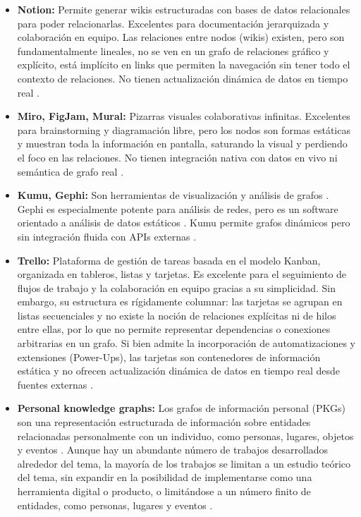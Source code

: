 \begin{itemize}
  \item \textbf{Notion:} Permite generar wikis estructuradas con bases de datos relacionales para poder relacionarlas. Excelentes para documentación jerarquizada y colaboración en equipo. Las relaciones entre nodos (wikis) existen, pero son fundamentalmente lineales, no se ven en un grafo de relaciones gráfico y explícito, está implícito en links que permiten la navegación sin tener todo el contexto de relaciones. No tienen actualización dinámica de datos en tiempo real \cite{notion_about, morton2025}.
  \item \textbf{Miro, FigJam, Mural:} Pizarras visuales colaborativas infinitas. Excelentes para brainstorming \cite{mural_brainstorming} y diagramación libre, pero los nodos son formas estáticas y muestran toda la información en pantalla, saturando la visual y perdiendo el foco en las relaciones. No tienen integración nativa con datos en vivo ni semántica de grafo real \cite{miro_about, yamashita2021, morton2025}.
  \item \textbf{Kumu, Gephi:} Son herramientas de visualización y análisis de grafos \cite{wills2026}. Gephi es especialmente potente para análisis de redes, pero es un software orientado a análisis de datos estáticos \cite{ouestware2025}. Kumu permite grafos dinámicos pero sin integración fluida con APIs externas \cite{kumu_manifesto}.
  \item \textbf{Trello:} Plataforma de gestión de tareas basada en el modelo Kanban, organizada en tableros, listas y tarjetas. Es excelente para el seguimiento de flujos de trabajo y la colaboración en equipo gracias a su simplicidad. Sin embargo, su estructura es rígidamente columnar: las tarjetas se agrupan en listas secuenciales y no existe la noción de relaciones explícitas ni de hilos entre ellas, por lo que no permite representar dependencias o conexiones arbitrarias en un grafo. Si bien admite la incorporación de automatizaciones y extensiones (Power-Ups), las tarjetas son contenedores de información estática y no ofrecen actualización dinámica de datos en tiempo real desde fuentes externas \cite{trello_about}.
  \item \textbf{Personal knowledge graphs:} Los grafos de información personal (PKGs) son una representación estructurada de información sobre entidades relacionadas personalmente con un individuo, como personas, lugares, objetos y eventos \cite{velitchkov2023}. Aunque hay un abundante número de trabajos desarrollados alrededor del tema, la mayoría de los trabajos se limitan a un estudio teórico del tema, sin expandir en la posibilidad de implementarse como una herramienta digital o producto, o limitándose a un número finito de entidades, como personas, lugares y eventos \cite{new2026, pavlyshyn2024, rasmus2024}.

\end{itemize}
